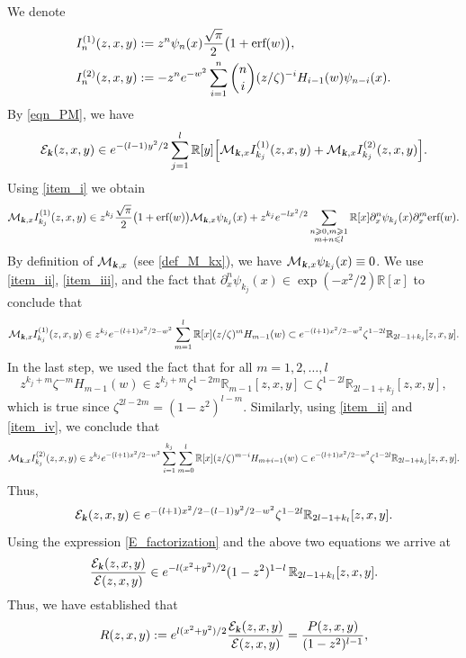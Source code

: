 \documentclass[12pt]{article}
\def\E{{\mathcal E}}
\def\r{{\mathbb R}}
\def\k{\textbf{\textsl{k}}}
\begin{document}
We denote
\begin{align*}
I^{(1)}_n(z,x,y)&:=
 z^n \psi_n(x)  \frac{\sqrt{\pi}}{2} \big( 1+ 
{\textnormal{erf}}(w) \big),
\\ 
I_n^{(2)}(z,x,y)&:=-z^n e^{-w^2} \sum\limits_{i=1}^n \binom{n}{i}  (z/\zeta)^{-i}
H_{i-1}(w) \psi_{n-i}(x).
\end{align*}
By \eqref{eqn_PM}, we have 
\[
\E_{\k}(z,x,y) \in e^{-(l-1) y^2/2}  \sum\limits_{j=1}^l  \r[y] \Big[ {\mathcal M}_{\k,x} I^{(1)}_{k_j}(z,x,y)+{\mathcal M}_{\k,x} I^{(2)}_{k_j}(z,x,y)\Big].
\]
Using \eqref{item_i} we obtain
\[
{\mathcal M}_{\k,x} I^{(1)}_{k_j}(z,x,y) \in 
 z^{k_j} \frac{\sqrt{\pi}}{2} \big( 1+ 
{\textnormal{erf}}(w) \big) {\mathcal M}_{\k,x} \psi_{k_j}(x)+
 z^{k_j} e^{-lx^2/2} \sum\limits_{\substack{n\geqslant 0, m\geqslant 1 \\ m+n\leqslant l}}   \r[x] \partial_x^n \psi_{k_j}(x)\partial_x^m {\textnormal{erf}}(w).
\]
By definition of ${\mathcal M}_{\k,x}$ (see \eqref{def_M_kx}), we have ${\mathcal M}_{\k,x} \psi_{k_j}(x)\equiv 0$. We use \eqref{item_ii}, \eqref{item_iii}, and the fact that $\partial_x^n \psi_{k_j}(x)\in \exp(-x^2/2) \r[x]$ to conclude that 
\[
{\mathcal M}_{\k,x} I^{(1)}_{k_j}(z,x,y) \in 
 z^{k_j}  e^{-(l+1)x^2/2-w^2} \sum\limits_{m=1}^l   \r[x] (z/\zeta)^m H_{m-1}(w)\subset  e^{-(l+1)x^2/2-w^2} \zeta^{1-2l} \r_{2l-1+k_j}[z,x,y].
\]
In the last step, we used the fact that for all $m=1,2,\dots,l$
\[
z^{k_j+m} \zeta^{-m} H_{m-1}(w) \in 
z^{k_j+m} \zeta^{1-2m} \r_{m-1}[z,x,y] \subset \zeta^{1-2l} \r_{2l-1+k_j}[z,x,y], 
\]
which is true since $\zeta^{2l-2m}=(1-z^2)^{l-m}$. 
Similarly, using \eqref{item_ii} and \eqref{item_iv}, we conclude that 
\[
{\mathcal M}_{\k,x} I^{(2)}_{k_j}(z,x,y) 
\in z^{k_j} e^{-(l+1)x^2/2-w^2} \sum\limits_{i=1}^{k_j} \sum\limits_{m=0}^l \r[x] (z/\zeta)^{m-i} H_{m+i-1}(w) 
\subset e^{-(l+1)x^2/2-w^2} \zeta^{1-2l} \r_{2l-1+k_j}[z,x,y]. 
\]
Thus, 
\[
\E_{\k}(z,x,y) \in e^{-(l+1)x^2/2-(l-1)y^2/2-w^2} \zeta^{1-2l} \r_{2l-1+k_l}[z,x,y].
\]
Using the expression \eqref{E_factorization} and 
the above two equations we arrive at 
\[
\frac{\E_{\k}(z,x,y)}{\E(z,x,y)} \in e^{-l(x^2+y^2)/2} (1-z^2)^{1-l} \, \r_{2l-1+k_l}[z,x,y]. 
\]
Thus, we have established that
\begin{equation}\label{R_and_P}
R(z,x,y):=e^{l(x^2+y^2)/2} \frac{\E_{\k}(z,x,y)}{\E(z,x,y)}=\frac{P(z,x,y)}{(1-z^2)^{l-1}},
\end{equation}
\end{document}
